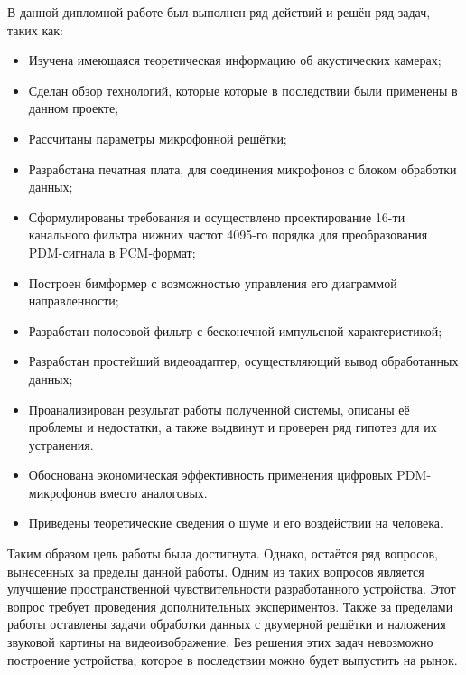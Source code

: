 В данной дипломной работе был выполнен ряд действий и решён ряд задач, таких как:
\begin{itemize}
	\item Изучена имеющаяся теоретическая информацию об акустических камерах;
	\item Сделан обзор технологий, которые которые в последствии были применены в данном проекте;
	\item Рассчитаны параметры микрофонной решётки;
	\item Разработана печатная плата, для соединения микрофонов с блоком обработки данных;
	\item Сформулированы требования и осуществлено проектирование 16-ти канального фильтра нижних частот 4095-го порядка для преобразования PDM-сигнала в PCM-формат;
	\item Построен бимформер с возможностью управления его диаграммой направленности;
	\item Разработан полосовой фильтр с бесконечной импульсной характеристикой;
	\item Разработан простейший видеоадаптер, осуществляющий вывод обработанных данных;
	\item Проанализирован результат работы полученной системы, описаны её проблемы и недостатки, а также выдвинут и проверен ряд гипотез для их устранения.
	\item Обоснована экономическая эффективность применения цифровых PDM-микрофонов вместо аналоговых.
	\item Приведены теоретические сведения о шуме и его воздействии на человека.
\end{itemize}

Таким образом цель работы была достигнута. Однако, остаётся ряд вопросов, вынесенных за пределы данной работы. Одним из таких вопросов является улучшение пространственной чувствительности разработанного устройства. Этот вопрос требует проведения дополнительных экспериментов. Также за пределами работы оставлены задачи обработки данных с двумерной решётки и наложения звуковой картины на видеоизображение. Без решения этих задач невозможно построение устройства, которое в последствии можно будет выпустить на рынок.